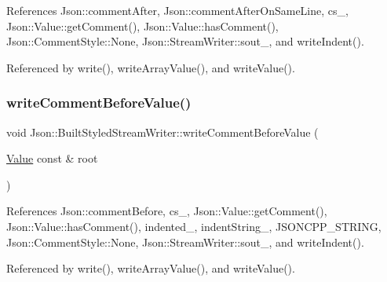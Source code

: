 References Json\+::comment\+After, Json\+::comment\+After\+On\+Same\+Line, cs\+\_\+, Json\+::\+Value\+::get\+Comment(), Json\+::\+Value\+::has\+Comment(), Json\+::\+Comment\+Style\+::\+None, Json\+::\+Stream\+Writer\+::sout\+\_\+, and write\+Indent().



Referenced by write(), write\+Array\+Value(), and write\+Value().

\mbox{\label{structJson_1_1BuiltStyledStreamWriter_a32c4afca4e08fba79bb0a80a8010283a_a32c4afca4e08fba79bb0a80a8010283a}} 
\subsubsection{\texorpdfstring{write\+Comment\+Before\+Value()}{writeCommentBeforeValue()}}
{\footnotesize\ttfamily void Json\+::\+Built\+Styled\+Stream\+Writer\+::write\+Comment\+Before\+Value (\begin{DoxyParamCaption}\item[{\hyperlink{classJson_1_1Value}{Value} const \&}]{root }\end{DoxyParamCaption})\hspace{0.3cm}{\ttfamily [private]}}



References Json\+::comment\+Before, cs\+\_\+, Json\+::\+Value\+::get\+Comment(), Json\+::\+Value\+::has\+Comment(), indented\+\_\+, indent\+String\+\_\+, J\+S\+O\+N\+C\+P\+P\+\_\+\+S\+T\+R\+I\+NG, Json\+::\+Comment\+Style\+::\+None, Json\+::\+Stream\+Writer\+::sout\+\_\+, and write\+Indent().



Referenced by write(), write\+Array\+Value(), and write\+Value().

\mbox{\label{structJson_1_1BuiltStyledStreamWriter_a2b38a3714d415c4bd3b4812897130f3d_a2b38a3714d415c4bd3b4812897130f3d}} 
